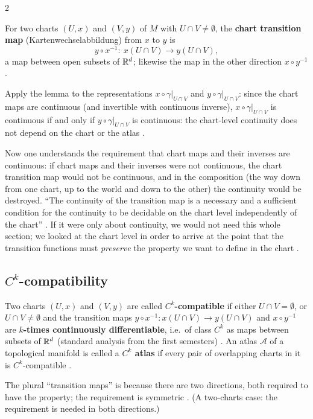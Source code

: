 \begin{paracol}{2}
\begin{definition}\label{def:dm-transition}
For two charts $(U,x)$ and $(V,y)$ of $M$ with $U\cap V\ne\emptyset$, the \textbf{chart transition map}
(Kartenwechselabbildung) from $x$ to $y$ is
\[
  y\circ x^{-1}\colon\ x(U\cap V)\to y(U\cap V),
\]
a map between open subsets of $\mathbb{R}^d$; likewise the map in the other direction $x\circ y^{-1}$
.
\end{definition}
Apply the lemma to the representations $x\circ\gamma|_{U\cap V}$ and $y\circ\gamma|_{U\cap V}$: since the chart maps
are continuous (and invertible with continuous inverse), $x\circ\gamma|_{U\cap V}$ is continuous if and only if
$y\circ\gamma|_{U\cap V}$ is continuous: the chart-level continuity does not depend on the chart or the atlas
.

\begin{intuition}
Now one understands the requirement that chart maps and their inverses are continuous: if chart maps and their inverses were
not continuous, the chart transition map would not be continuous, and in the composition (the way down from one chart,
up to the world and down to the other) the continuity would be destroyed. ``The continuity of the transition map is a
necessary and a sufficient condition for the continuity to be decidable on the chart level independently of the chart''
. If it were only about
continuity, we would not need this whole section; we looked at the chart level in order to arrive at the point that the
transition functions must \emph{preserve} the property we want to define in the chart .
\end{intuition}

\subsection{$C^k$-compatibility}\label{ssec:dm-compat}

\begin{definition}\label{def:dm-compat}
Two charts $(U,x)$ and $(V,y)$ are called \textbf{$C^k$-compatible} if either $U\cap V=\emptyset$, or $U\cap V\ne\emptyset$
and the transition maps $y\circ x^{-1}\colon x(U\cap V)\to y(U\cap V)$ and $x\circ y^{-1}$ are \textbf{$k$-times continuously
differentiable}, i.e.\ of class $C^k$ as maps between subsets of $\mathbb{R}^d$ (standard analysis from the first semesters)
.
An atlas $\mathcal A$ of a topological manifold is called a \textbf{$C^k$ atlas} if every pair of overlapping charts in it
is $C^k$-compatible .
\end{definition}
The plural ``transition maps'' is because there are two directions, both required to have the property; the
requirement is symmetric . (A two-charts case: the requirement is
needed in both directions.)


\end{paracol}
